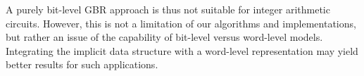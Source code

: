 A purely
bit-level GBR approach is thus not suitable for integer arithmetic
circuits. However, this is not a limitation of our algorithms and
implementations, but rather an issue of the capability of bit-level
versus word-level models. Integrating the implicit data structure with
a word-level representation may yield better results for
such applications.







